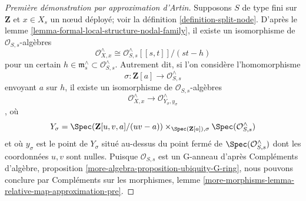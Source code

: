 \begin{proof}[Première démonstration par approximation d'Artin]
\medskip\noindent
Supposons $S$ de type fini sur $\mathbf{Z}$ et $x \in X_s$ un nœud déployé; voir la définition \ref{definition-split-node}. D'après le lemme \ref{lemma-formal-local-structure-nodal-family}, il existe un isomorphisme de $\mathcal{O}_{S, s}$-algèbres $$
\mathcal{O}_{X, x}^\wedge \cong
\mathcal{O}_{S, s}^\wedge[[s, t]]/(st - h)
$$ pour un certain $h \in \mathfrak m_s^\wedge \subset \mathcal{O}_{S, s}^\wedge$. Autrement dit, si l'on considère l'homomorphisme $$
\sigma : \mathbf{Z}[a] \longrightarrow \mathcal{O}_{S, s}^\wedge
$$ envoyant $a$ sur $h$, il existe un isomorphisme de $\mathcal{O}_{S, s}$-algèbres $$
\mathcal{O}_{X, x}^\wedge
\longrightarrow
\mathcal{O}_{Y_\sigma, y_\sigma}^\wedge
$$, où $$
Y_\sigma = \Spec(\mathbf{Z}[u, v, a]/(uv - a))
\times_{\Spec(\mathbf{Z}[a]), \sigma} \Spec(\mathcal{O}_{S, s}^\wedge)
$$ et où $y_\sigma$ est le point de $Y_\sigma$ situé au-dessus du point fermé de $\Spec(\mathcal{O}_{S, s}^\wedge)$ dont les coordonnées $u, v$ sont nulles. Puisque $\mathcal{O}_{S, s}$ est un G-anneau d'après Compléments d'algèbre, proposition \ref{more-algebra-proposition-ubiquity-G-ring}, nous pouvons conclure par Compléments sur les morphismes, lemme \ref{more-morphisms-lemma-relative-map-approximation-pre}.
\end{proof}

